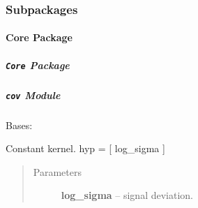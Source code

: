 \documentclass[letterpaper,10pt,english]{sphinxmanual}
\begin{document}
\subsubsection{Subpackages}
\label{pyGPs:subpackages}

\paragraph{Core Package}
\label{pyGPs.Core::doc}\label{pyGPs.Core:core-package}

\subparagraph{\texttt{Core} Package}
\label{pyGPs.Core:id1}\label{pyGPs.Core:module-pyGPs.Core}

\subparagraph{\texttt{cov} Module}
\label{pyGPs.Core:module-pyGPs.Core.cov}\label{pyGPs.Core:cov-module}

\begin{fulllineitems}
\label{pyGPs.Core:pyGPs.Core.cov.Const}
Bases: 

Constant kernel. hyp = {[} log\_sigma {]}
\begin{quote}\begin{description}
\item[{Parameters}] \leavevmode
\textbf{log\_sigma} -- signal deviation.

\end{description}\end{quote}

\begin{fulllineitems}
\label{pyGPs.Core:pyGPs.Core.cov.Const.getCovMatrix}
\end{fulllineitems}


\begin{fulllineitems}
\label{pyGPs.Core:pyGPs.Core.cov.Const.getDerMatrix}
\end{fulllineitems}


\end{fulllineitems}

\end{document}
